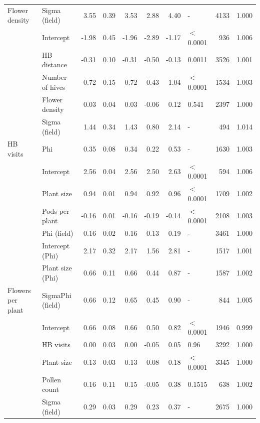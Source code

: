 \begin{longtable}{l|l|r|r|r|r|r|l|r|r}
\cline{2-10}
\multirow{-6}{*}{\raggedright\arraybackslash Flower density} & Sigma (field) & 3.55 & 0.39 & 3.53 & 2.88 & 4.40 & - & 4133 & 1.000\\
\cline{1-10}
 & Intercept & -1.98 & 0.45 & -1.96 & -2.89 & -1.17 & $<$0.0001 & 936 & 1.006\\
\cline{2-10}
 & HB distance & -0.31 & 0.10 & -0.31 & -0.50 & -0.13 & 0.0011 & 3526 & 1.001\\
\cline{2-10}
 & Number of hives & 0.72 & 0.15 & 0.72 & 0.43 & 1.04 & $<$0.0001 & 1534 & 1.003\\
\cline{2-10}
 & Flower density & 0.03 & 0.04 & 0.03 & -0.06 & 0.12 & 0.541 & 2397 & 1.000\\
\cline{2-10}
 & Sigma (field) & 1.44 & 0.34 & 1.43 & 0.80 & 2.14 & - & 494 & 1.014\\
\cline{2-10}
\multirow{-6}{*}{\raggedright\arraybackslash HB visits} & Phi & 0.35 & 0.08 & 0.34 & 0.22 & 0.53 & - & 1630 & 1.003\\
\cline{1-10}
 & Intercept & 2.56 & 0.04 & 2.56 & 2.50 & 2.63 & $<$0.0001 & 594 & 1.006\\
\cline{2-10}
 & Plant size & 0.94 & 0.01 & 0.94 & 0.92 & 0.96 & $<$0.0001 & 1709 & 1.002\\
\cline{2-10}
 & Pods per plant & -0.16 & 0.01 & -0.16 & -0.19 & -0.14 & $<$0.0001 & 2108 & 1.003\\
\cline{2-10}
 & Phi (field) & 0.16 & 0.02 & 0.16 & 0.13 & 0.19 & - & 3461 & 1.000\\
\cline{2-10}
 & Intercept (Phi) & 2.17 & 0.32 & 2.17 & 1.56 & 2.81 & - & 1517 & 1.001\\
\cline{2-10}
 & Plant size (Phi) & 0.66 & 0.11 & 0.66 & 0.44 & 0.87 & - & 1587 & 1.002\\
\cline{2-10}
\multirow{-7}{*}{\raggedright\arraybackslash Flowers per plant} & SigmaPhi (field) & 0.66 & 0.12 & 0.65 & 0.45 & 0.90 & - & 844 & 1.005\\
\cline{1-10}
 & Intercept & 0.66 & 0.08 & 0.66 & 0.50 & 0.82 & $<$0.0001 & 1946 & 0.999\\
\cline{2-10}
 & HB visits & 0.00 & 0.03 & 0.00 & -0.05 & 0.05 & 0.96 & 3292 & 1.000\\
\cline{2-10}
 & Plant size & 0.13 & 0.03 & 0.13 & 0.08 & 0.18 & $<$0.0001 & 3345 & 1.000\\
\cline{2-10}
 & Pollen count & 0.16 & 0.11 & 0.15 & -0.05 & 0.38 & 0.1515 & 638 & 1.002\\
\cline{2-10}
 & Sigma (field) & 0.29 & 0.03 & 0.29 & 0.23 & 0.37 & - & 2675 & 1.000\\

\end{longtable}
